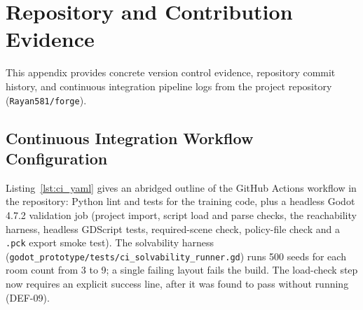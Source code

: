 \chapter{Repository and Contribution Evidence}
\label{app:repo}

This appendix provides concrete version control evidence, repository commit history, and continuous integration pipeline logs from the project repository (\texttt{Rayan581/forge}).

\section[Continuous Integration Workflow Configuration]{Continuous Integration Workflow Configuration}
Listing~\ref{lst:ci_yaml} gives an abridged outline of the GitHub Actions workflow in the repository: Python lint and tests for the training code, plus a headless Godot 4.7.2 validation job (project import, script load and parse checks, the reachability harness, headless GDScript tests, required-scene check, policy-file check and a \texttt{.pck} export smoke test). The solvability harness (\texttt{godot\_prototype/tests/ci\_solvability\_runner.gd}) runs 500 seeds for each room count from 3 to 9; a single failing layout fails the build. The load-check step now requires an explicit success line, after it was found to pass without running (DEF-09).

